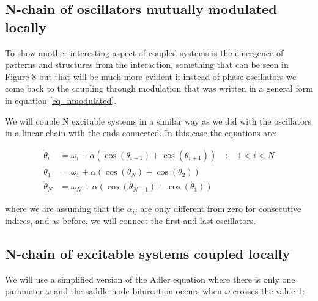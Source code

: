 \documentclass{article}
\begin{document}

\subsection{N-chain of oscillators mutually modulated locally}

To show another interesting aspect of coupled systems is the emergence of patterns and structures from the interaction, something that can be seen in Figure 8 but that will be much more evident if instead of phase oscillators we come back to the coupling through modulation that was written in a general form in equation \ref{eq_nmodulated}.

We will couple N excitable systems in a similar way as we did with the oscillators in a linear chain with the ends connected. In this case the equations are:

\begin{subequations} \label{eq_Nexcoupled}
\begin{align} 
    \dot{\theta}_i &= \omega_i + \alpha \left(\cos(\theta_{i-1})+\cos(\theta_{i+1})\right)  \quad : \quad 1<i<N \\
    \dot{\theta}_1 &= \omega_1 + \alpha \left(\cos(\theta_{N})+\cos(\theta_{2})\right) \\
    \dot{\theta}_N &= \omega_N + \alpha \left(\cos(\theta_{N-1})+\cos(\theta_{1})\right) 
\end{align}
\end{subequations}

where we are assuming that the $\alpha_{ij}$ are only different from zero for consecutive indices, and
as before, we will connect the first and last oscillators.

\begin{figure} [h]
    \centerline{}
    \caption{}
    \label{fig_noscmodulated}
\end{figure}

\newpage

\subsection{N-chain of excitable systems coupled locally}


We will use a simplified version of the Adler equation where there is only one parameter $\omega$ and the saddle-node bifurcation occurs when $\omega$ crosses the value 1:
\end{document}
